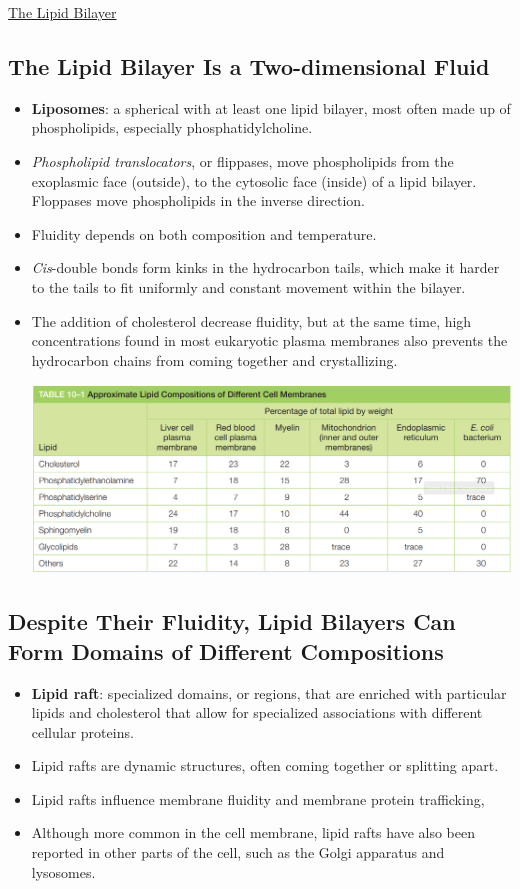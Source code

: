 \documentclass[12pt,letterpaper]{article}
\begin{document}
\begin{secbox}{\hyperlink{10}{The Lipid Bilayer}}
{    \subsection*{The Lipid Bilayer Is a Two-dimensional Fluid}
    \begin{itemize}   
        \item \textbf{Liposomes}: a spherical with at least one lipid bilayer, most often made up of phospholipids, especially phosphatidylcholine.
        \item \textit{Phospholipid translocators}, or flippases, move phospholipids from the exoplasmic face (outside), to the cytosolic face (inside) of a lipid bilayer. Floppases move phospholipids in the inverse direction. 
        \item Fluidity depends on both composition and temperature. 
        \item \textit{Cis}-double bonds form kinks in the hydrocarbon tails, which make it harder to the tails to fit uniformly and constant movement within the bilayer.
        \item The addition of cholesterol decrease fluidity, but at the same time, high concentrations found in most eukaryotic plasma membranes also prevents the hydrocarbon chains from coming together and crystallizing.\par
        \includegraphics[width=\linewidth]{images/table_10_1.png}
    \end{itemize}

    \subsection*{Despite Their Fluidity, Lipid Bilayers Can Form Domains of Different Compositions}
    \begin{itemize}
        \item \textbf{Lipid raft}: specialized domains, or regions, that are enriched with particular lipids and cholesterol that allow for specialized associations with different cellular proteins. 
        \item Lipid rafts are dynamic structures, often coming together or splitting apart.\
        \item Lipid rafts influence membrane fluidity and membrane protein trafficking,
        \item Although more common in the cell membrane, lipid rafts have also been reported in other parts of the cell, such as the Golgi apparatus and lysosomes.
    \end{itemize}

}
\end{secbox}
\end{document}
